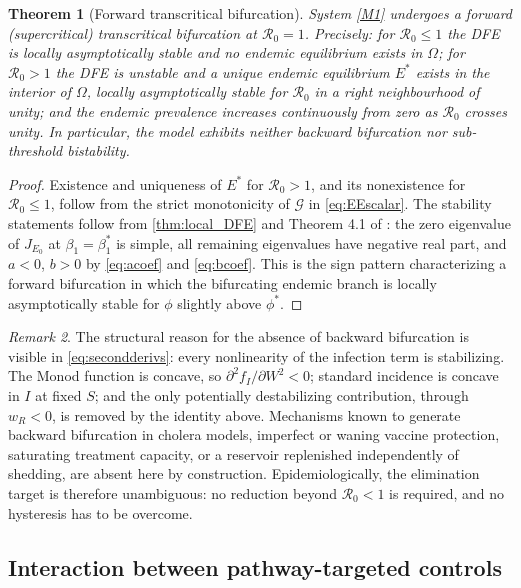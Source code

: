 \documentclass[11pt]{article}
\theoremstyle{plain}
\newtheorem{theorem}{Theorem}[section]
\theoremstyle{definition}
\theoremstyle{remark}
\newtheorem{remark}[theorem]{Remark}
\newcommand{\Rz}{\mathcal{R}_0}
\begin{document}
\begin{theorem}[Forward transcritical bifurcation]\label{thm:bifurcation}
System \eqref{M1} undergoes a forward (supercritical) transcritical bifurcation at $\Rz=1$. Precisely: for $\Rz\le1$ the DFE is locally asymptotically stable and no endemic equilibrium exists in $\Omega$; for $\Rz>1$ the DFE is unstable and a unique endemic equilibrium $E^*$ exists in the interior of $\Omega$, locally asymptotically stable for $\Rz$ in a right neighbourhood of unity; and the endemic prevalence increases continuously from zero as $\Rz$ crosses unity. In particular, the model exhibits neither backward bifurcation nor sub-threshold bistability.
\end{theorem}

\begin{proof}
Existence and uniqueness of $E^*$ for $\Rz>1$, and its nonexistence for $\Rz\le1$, follow from the strict monotonicity of $\mathcal{G}$ in \eqref{eq:EEscalar}. The stability statements follow from \cref{thm:local_DFE} and Theorem 4.1 of \cite{castilloChavezSong2004}: the zero eigenvalue of $J_{E_0}$ at $\beta_1=\beta_1^*$ is simple, all remaining eigenvalues have negative real part, and $a<0$, $b>0$ by \eqref{eq:acoef} and \eqref{eq:bcoef}. This is the sign pattern characterizing a forward bifurcation in which the bifurcating endemic branch is locally asymptotically stable for $\phi$ slightly above $\phi^*$.
\end{proof}

\begin{remark}\label{rem:noBB}
The structural reason for the absence of backward bifurcation is visible in \eqref{eq:secondderivs}: every nonlinearity of the infection term is stabilizing. The Monod function is concave, so $\partial^2f_I/\partial W^2<0$; standard incidence is concave in $I$ at fixed $S$; and the only potentially destabilizing contribution, through $w_R<0$, is removed by the identity above. Mechanisms known to generate backward bifurcation in cholera models, imperfect or waning vaccine protection, saturating treatment capacity, or a reservoir replenished independently of shedding, are absent here by construction. Epidemiologically, the elimination target is therefore unambiguous: no reduction beyond $\Rz<1$ is required, and no hysteresis has to be overcome.
\end{remark}

\subsection{Interaction between pathway-targeted controls}\label{subsec:synergy_theory}
\end{document}
